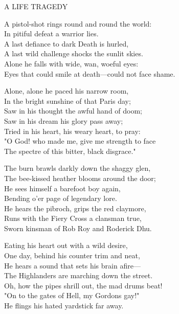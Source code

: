 \begin{poemblock}
 
A LIFE TRAGEDY

A pistol-shot rings round and round the world:\\
\hspace*{3em}In pitiful defeat a warrior lies.\\
A last defiance to dark Death is hurled,\\
\hspace*{3em}A last wild challenge shocks the sunlit skies.\\
\hspace*{3em}Alone he falls with wide, wan, woeful eyes:\\
Eyes that could smile at death—could not face shame.

Alone, alone he paced his narrow room,\\
\hspace*{3em}In the bright sunshine of that Paris day;\\
Saw in his thought the awful hand of doom;\\
\hspace*{3em}Saw in his dream his glory pass away;\\
\hspace*{3em}Tried in his heart, his weary heart, to pray:\\
"O God! who made me, give me strength to face\\
The spectre of this bitter, black disgrace."

The burn brawls darkly down the shaggy glen,\\
\hspace*{3em}The bee-kissed heather blooms around the door;\\
He sees himself a barefoot boy again,\\
\hspace*{3em}Bending o'er page of legendary lore.\\
\hspace*{3em}He hears the pibroch, grips the red claymore,\\
Runs with the Fiery Cross a clansman true,\\
Sworn kinsman of Rob Roy and Roderick Dhu.

Eating his heart out with a wild desire,\\
\hspace*{3em}One day, behind his counter trim and neat,\\
He hears a sound that sets his brain afire—\\
\hspace*{3em}The Highlanders are marching down the street.\\
\hspace*{3em}Oh, how the pipes shrill out, the mad drums beat!\\
"On to the gates of Hell, my Gordons gay!"\\
He flings his hated yardstick far away.


\end{poemblock}
